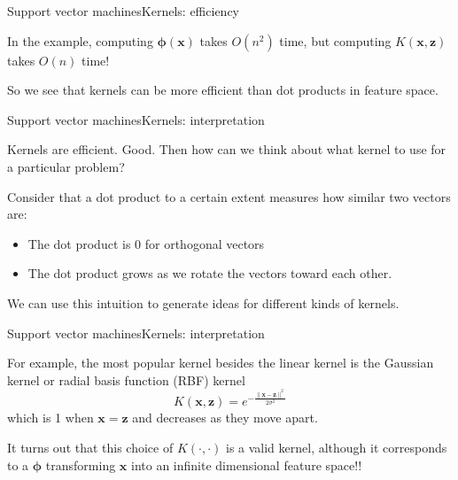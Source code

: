 \documentclass{beamer}
\renewcommand{\vec}[1]{\boldsymbol{#1}}
\begin{document}
\begin{frame}{Support vector machines}{Kernels: efficiency}

  In the example, computing $\vec{\phi}(\vec{x})$ takes $O(n^2)$ time,
  but computing $K(\vec{x},\vec{z})$ takes $O(n)$ time!

  \medskip

  So we see that kernels can be more efficient than dot products in feature
  space.

\end{frame}


\begin{frame}{Support vector machines}{Kernels: interpretation}

  Kernels are efficient. Good. Then how can we think about what kernel
  to use for a particular problem?

  \medskip

  Consider that a dot product to a certain extent measures how similar
  two vectors are:
  \begin{itemize}
  \item The dot product is 0 for orthogonal vectors
  \item The dot product grows as we rotate the vectors toward each other.
  \end{itemize}

  \medskip

  We can use this intuition to generate ideas for different kinds of kernels.

\end{frame}


\begin{frame}{Support vector machines}{Kernels: interpretation}

  For example, the most popular kernel besides the linear kernel is the
  \alert{Gaussian kernel} or \alert{radial basis function (RBF) kernel}
  \[ K(\vec{x},\vec{z}) = e^{-\frac{\|\vec{x}-\vec{z}\|^2}{2\sigma^2}} \]
  which is 1 when $\vec{x}=\vec{z}$ and decreases as they move apart.

  \medskip

  It turns out that this choice of $K(\cdot,\cdot)$ is a valid kernel,
  although it corresponds to a $\vec{\phi}$ transforming $\vec{x}$ into
  \alert{an infinite dimensional feature space}!!
  
\end{frame}
\end{document}
